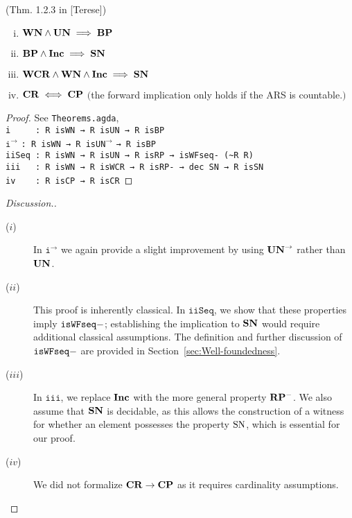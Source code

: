 \begin{theorem}(Thm. 1.2.3 in [Terese])
  \begin{enumerate}[(i)]
    \item $\mathbf{WN} \land \mathbf{UN} \implies \mathbf{BP}$
    \item $\mathbf{BP} \land \mathbf{Inc} \implies \mathbf{SN}$
    \item $\mathbf{WCR} \land \mathbf{WN} \land \mathbf{Inc} \implies \mathbf{SN}$
    \item $\mathbf{CR} \iff \mathbf{CP}$ $($the forward implication only holds if the ARS is countable.$)$
  \end{enumerate}
\end{theorem}

\begin{proof}
    See \texttt{Theorems.agda},\\
    \verb|i     : R isWN → R isUN → R isBP|\\
    $\mathtt{i^\to}$\hspace{5mm} \verb|: R isWN → R |\texttt{isUN}$^{\to}$ \verb|→ R isBP|\\
    \verb|iiSeq : R isWN → R isUN → R isRP → isWFseq- (~R R)|\\
    \verb|iii   : R isWN → R isWCR → R isRP- → dec SN → R isSN|\\
    \verb|iv    : R isCP → R isCR|
\end{proof}
\begin{proof}[Discussion.]\hfill
  \begin{description}
    \item[($i$)] In $\mathtt{i^\to}$ we again provide a slight improvement by using $\mathbf{UN}^{\to}$ rather than $\mathbf{UN}$.
    \item[($ii$)] This proof is inherently classical. In $\mathtt{iiSeq}$, we show that these properties imply $\mathtt{isWFseq-}$; establishing the implication to $\mathbf{SN}$ would require additional classical assumptions. The definition and further discussion of $\mathtt{isWFseq-}$ are provided in Section~\ref{sec:Well-foundedness}.
    \item[($iii$)] In $\mathtt{iii}$, we replace $\mathbf{Inc}$ with the more general property $\mathbf{RP^{-}}$. We also assume that $\mathbf{SN}$ is decidable, as this allows the construction of a witness for whether an element possesses the property $\mathrm{SN}$, which is essential for our proof.
    \item[($iv$)] We did not formalize $\mathbf{CR} \to \mathbf{CP}$ as it requires cardinality assumptions. \qedhere
  \end{description}
\end{proof}

